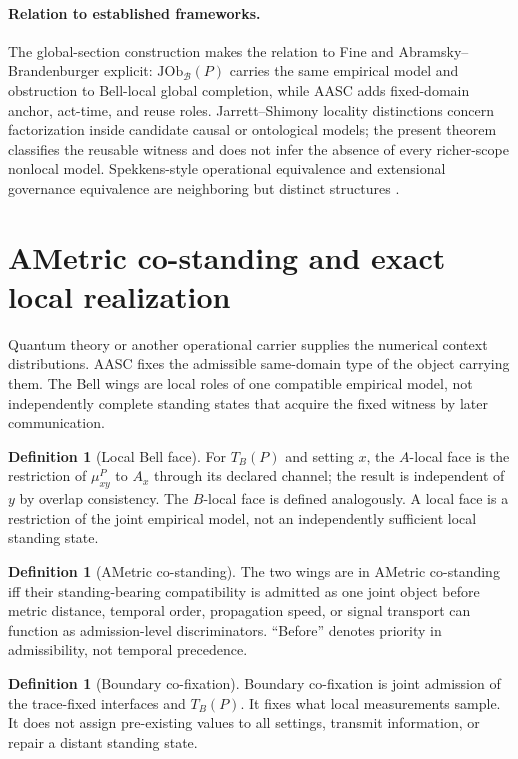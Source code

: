 \documentclass[11pt]{article}
\theoremstyle{definition}
\newtheorem{definition}[theorem]{Definition}
\newcommand{\Bell}{\mathcal{B}}
\newcommand{\JOb}{\mathrm{JOb}_{\Bell}}
\begin{document}
\paragraph{Relation to established frameworks.}
The global-section construction makes the relation to Fine and Abramsky--Brandenburger explicit: $\JOb(P)$ carries the same empirical model and obstruction to Bell-local global completion, while AASC adds fixed-domain anchor, act-time, and reuse roles. Jarrett--Shimony locality distinctions concern factorization inside candidate causal or ontological models; the present theorem classifies the reusable witness and does not infer the absence of every richer-scope nonlocal model. Spekkens-style operational equivalence and extensional governance equivalence are neighboring but distinct structures \cite{Jarrett1984,Shimony1986,Spekkens2005}.

\section{AMetric co-standing and exact local realization}\label{sec:costanding}

Quantum theory or another operational carrier supplies the numerical context distributions. AASC fixes the admissible same-domain type of the object carrying them. The Bell wings are local roles of one compatible empirical model, not independently complete standing states that acquire the fixed witness by later communication.

\begin{definition}[Local Bell face]\label{def:localbellface}
For $T_B(P)$ and setting $x$, the $A$-local face is the restriction of $\mu^P_{xy}$ to $A_x$ through its declared channel; the result is independent of $y$ by overlap consistency. The $B$-local face is defined analogously. A local face is a restriction of the joint empirical model, not an independently sufficient local standing state.
\end{definition}

\begin{definition}[AMetric co-standing]\label{def:ametriccostanding}
The two wings are in AMetric co-standing iff their standing-bearing compatibility is admitted as one joint object before metric distance, temporal order, propagation speed, or signal transport can function as admission-level discriminators. ``Before'' denotes priority in admissibility, not temporal precedence.
\end{definition}

\begin{definition}[Boundary co-fixation]\label{def:boundarycofixation}
Boundary co-fixation is joint admission of the trace-fixed interfaces and $T_B(P)$. It fixes what local measurements sample. It does not assign pre-existing values to all settings, transmit information, or repair a distant standing state.
\end{definition}
\end{document}
